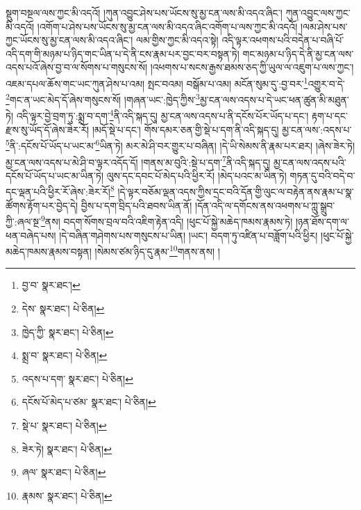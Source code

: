 སྡུག་བསྔལ་ལས་ཀྱང་མི་འདའོ། །ཀུན་འབྱུང་ཤེས་པས་ཡོངས་སུ་མྱ་ངན་ལས་མི་འདའ་ཞིང་། ཀུན་འབྱུང་ལས་ཀྱང་མི་འདའོ། །འགོག་པ་ཤེས་པས་ཡོངས་སུ་མྱ་ངན་ལས་མི་འདའ་ཞིང་འགོག་པ་ལས་ཀྱང་མི་འདའོ། །ལམ་ཤེས་པས་ཀྱང་ཡོངས་སུ་མྱ་ངན་ལས་མི་འདའ་ཞིང་། ལམ་གྱིས་ཀྱང་མི་འདའ་སྟེ། འདི་ལྟར་འཕགས་པའི་བདེན་པ་བཞི་པོ་འདི་དག་གི་མཉམ་པ་ཉིད་གང་ཡིན་པ་དེ་ནི་ངས་རྣམ་པར་བྱང་བར་བསྟན་ཏེ། གང་མཉམ་པ་ཉིད་དེ་ནི་མྱ་ངན་ལས་འདས་པའོ་ཞེས་བྱ་བ་ལ་སོགས་པ་གསུངས་སོ། །འཕགས་པ་སངས་རྒྱས་ཐམས་ཅད་ཀྱི་ཡུལ་ལ་འཇུག་པ་ལས་ཀྱང་། འཇམ་དཔལ་ཆོས་གང་ཡང་ཀུན་ཤེས་པ་འམ། སྤང་བའམ། བསྒོམ་པ་འམ། མངོན་སུམ་དུ་:བྱ་བར་\footnote{བྱ་བ་  སྣར་ཐང་། }འགྱུར་བ་དེ་\footnote{དེས་  སྣར་ཐང་།  པེ་ཅིན། }གང་ན་ཡང་མེད་དོ་ཞེས་གསུངས་སོ། །གཞན་ཡང་:ཁྱེད་ཀྱིས་\footnote{ཁྱེད་ཀྱི་  སྣར་ཐང་།  པེ་ཅིན། }མྱ་ངན་ལས་འདས་པ་དེ་ཡང་ཕན་ཚུན་མི་མཐུན་ཏེ། འདི་ལྟར་བྱེ་བྲག་ཏུ་:སྨྲ་བ་དག་\footnote{སྨྲ་བ་  སྣར་ཐང་།  པེ་ཅིན། }ནི་འདི་སྐད་དུ། མྱ་ངན་ལས་འདས་པ་ནི་དངོས་པོར་ཡོད་པ་དང་། རྟག་པ་དང་རྫས་སུ་ཡོད་དོ་ཞེས་ཟེར་རོ། །མདོ་སྡེ་པ་དང་། གོས་དམར་ཅན་གྱི་སྡེ་པ་དག་ནི་འདི་སྐད་དུ། མྱ་ངན་ལས་:འདས་པ་\footnote{འདས་པ་དག་  སྣར་ཐང་།  པེ་ཅིན། }ནི་:དངོས་པོ་ཡོད་པ་ཡང་མ་\footnote{དངོས་པོ་མེད་པ་ཙམ་  སྣར་ཐང་།  པེ་ཅིན། }ཡིན་ཏེ། མར་མེ་ཤི་བར་གྱུར་པ་བཞིན། །དེ་ཡི་སེམས་ནི་རྣམ་པར་ཐར། །ཞེས་ཟེར་ཏེ། མྱ་ངན་ལས་འདས་པ་མེ་ཤི་བ་ལྟར་འདོད་དོ། །གནས་མ་བུའི་:སྡེ་པ་དག་\footnote{སྡེ་པ་  སྣར་ཐང་།  པེ་ཅིན། }ནི་འདི་སྐད་དུ། མྱ་ངན་ལས་འདས་པའི་དངོས་པོ་ཡོད་པ་ཡང་མ་ཡིན་ཏེ། ལུས་དང་དབང་པོ་མེད་པའི་ཕྱིར་རོ། །མེད་པའང་མ་ཡིན་ཏེ། གཏན་དུ་བའི་བདེ་བ་དང་ལྡན་པའི་ཕྱིར་རོ་ཞེས་:ཟེར་རོ།\footnote{ཟེར་ཏེ།  སྣར་ཐང་།  པེ་ཅིན། } །དེ་ལྟར་བཅོམ་ལྡན་འདས་ཀྱིས་དྲང་བའི་དོན་གྱི་ལུང་ལ་བརྟེན་ནས་རྣམ་པ་སྣ་ཚོགས་རྟོག་པར་བྱེད་དེ། བྱིས་པ་དག་བྲིད་པའི་ཐབས་ཡིན་ནོ། །དོན་འདི་ལ་དགོངས་ནས་འཕགས་པ་ཀླུ་སྒྲུབ་ཀྱི་:ཞལ་སྔ་\footnote{ཞལ་  སྣར་ཐང་།  པེ་ཅིན། }ནས། བདག་སོགས་བྲལ་བའི་འཇིག་རྟེན་འདི། །ཕུང་པོ་སྐྱེ་མཆེད་ཁམས་རྣམས་ཏེ། །ཉན་ཐོས་དག་ལ་ཕན་བཞེད་པས། །དེ་བཞིན་གཤེགས་པས་གསུངས་པ་ཡིན། །ཡང་། བདག་ཏུ་འཛིན་པ་བཟློག་པའི་ཕྱིར། །ཕུང་པོ་སྐྱེ་མཆེད་ཁམས་རྣམས་བསྟན། །སེམས་ཙམ་ཉིད་དུ་རྣམ་\footnote{རྣམས་  སྣར་ཐང་།  པེ་ཅིན། }གནས་ནས། །
